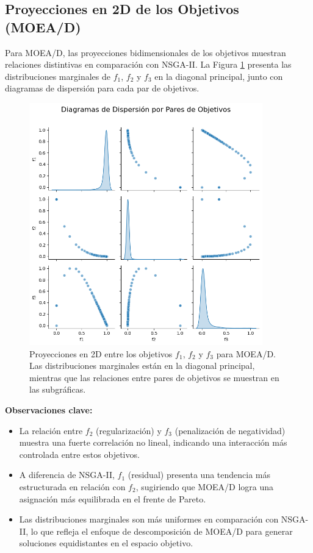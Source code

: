 \subsection{Proyecciones en 2D de los Objetivos (MOEA/D)}

Para MOEA/D, las proyecciones bidimensionales de los objetivos muestran relaciones distintivas en comparación con NSGA-II. La Figura \ref{fig:objective_projections_moead} presenta las distribuciones marginales de \(f_1\), \(f_2\) y \(f_3\) en la diagonal principal, junto con diagramas de dispersión para cada par de objetivos.

\begin{figure}[H]
    \centering
    \includegraphics[width=0.9\textwidth]{Images/pareto_projection_moead.png}
    \caption{Proyecciones en 2D entre los objetivos \( f_1 \), \( f_2 \) y \( f_3 \) para MOEA/D. Las distribuciones marginales están en la diagonal principal, mientras que las relaciones entre pares de objetivos se muestran en las subgráficas.}
    \label{fig:objective_projections_moead}
\end{figure}

\textbf{Observaciones clave:}
\begin{itemize}
    \item La relación entre \(f_2\) (regularización) y \(f_3\) (penalización de negatividad) muestra una fuerte correlación no lineal, indicando una interacción más controlada entre estos objetivos.
    \item A diferencia de NSGA-II, \(f_1\) (residual) presenta una tendencia más estructurada en relación con \(f_2\), sugiriendo que MOEA/D logra una asignación más equilibrada en el frente de Pareto.
    \item Las distribuciones marginales son más uniformes en comparación con NSGA-II, lo que refleja el enfoque de descomposición de MOEA/D para generar soluciones equidistantes en el espacio objetivo.
\end{itemize}

